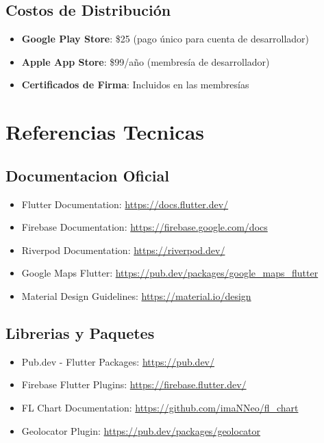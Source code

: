\documentclass[12pt,a4paper]{article}
\begin{document}
\subsection{Costos de Distribución}
\begin{itemize}[itemsep=0.5em]
    \item \textbf{Google Play Store}: \$25 (pago único para cuenta de desarrollador)
    \item \textbf{Apple App Store}: \$99/año (membresía de desarrollador)
    \item \textbf{Certificados de Firma}: Incluidos en las membresías
\end{itemize}

\section{Referencias Tecnicas}

\subsection{Documentacion Oficial}
\begin{itemize}[itemsep=0.5em]
    \item Flutter Documentation: \url{https://docs.flutter.dev/}
    \item Firebase Documentation: \url{https://firebase.google.com/docs}
    \item Riverpod Documentation: \url{https://riverpod.dev/}
    \item Google Maps Flutter: \url{https://pub.dev/packages/google_maps_flutter}
    \item Material Design Guidelines: \url{https://material.io/design}
\end{itemize}

\subsection{Librerias y Paquetes}
\begin{itemize}[itemsep=0.5em]
    \item Pub.dev - Flutter Packages: \url{https://pub.dev/}
    \item Firebase Flutter Plugins: \url{https://firebase.flutter.dev/}
    \item FL Chart Documentation: \url{https://github.com/imaNNeo/fl_chart}
    \item Geolocator Plugin: \url{https://pub.dev/packages/geolocator}
\end{itemize}
\end{document}
